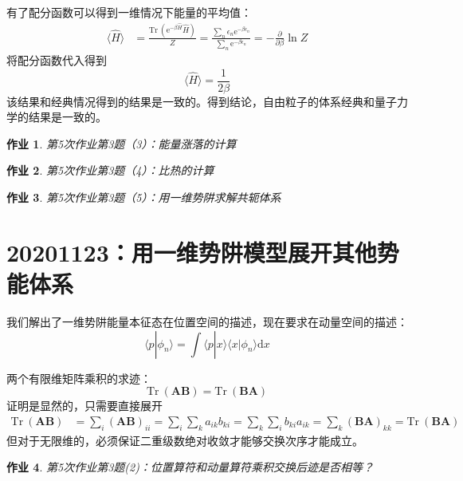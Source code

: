 \documentclass[12pt]{article}
\newtheorem{asg}{作业}
\begin{document}
    有了配分函数可以得到一维情况下能量的平均值：
    \begin{equation}\begin{aligned}
        \langle \hat{H} \rangle &= \frac {\mathrm{Tr} \ (\mathrm{e}^{-\beta \hat{H}} \hat{H})}Z
        = \frac {\sum_n \epsilon_n \mathrm{e}^{-\beta \epsilon_n}}{\sum_n \mathrm{e}^{-\beta \epsilon_n}}
        = -\frac {\partial}{\partial \beta} \ln{Z}
    \end{aligned}\end{equation}
    将配分函数代入得到
    \[ \langle \hat{H} \rangle = \frac 1{2\beta} \]
    该结果和经典情况得到的结果是一致的。得到结论，自由粒子的体系经典和量子力学的结果是一致的。
    \begin{asg}
        第5次作业第3题（3）：能量涨落的计算
    \end{asg}
    \begin{asg}
        第5次作业第3题（4）：比热的计算
    \end{asg}
    \begin{asg}
        第5次作业第3题（5）：用一维势阱求解共轭体系
    \end{asg}

\section{20201123：用一维势阱模型展开其他势能体系}

    我们解出了一维势阱能量本征态在位置空间的描述，现在要求在动量空间的描述：
    \[ \langle p|\phi_n \rangle = \int \langle p|x \rangle \langle x |\phi_n \rangle \mathrm{d}x \]

    两个有限维矩阵乘积的求迹：
    \begin{equation}
        \mathrm{Tr} \ (\bm{AB}) = \mathrm{Tr} \ (\bm{BA})
    \end{equation}
    证明是显然的，只需要直接展开
    \begin{equation}\begin{aligned}
        \mathrm{Tr} \ (\bm{AB}) &= \sum_i (\bm{AB})_{ii}
        = \sum_i \sum_k a_{ik}b_{ki}
        = \sum_k \sum_i b_{ki}a_{ik}
        = \sum_k \bm{(BA)}_{kk}
        = \mathrm{Tr} \ (\bm{BA})
    \end{aligned}\end{equation}
    但对于无限维的，必须保证二重级数绝对收敛才能够交换次序才能成立。
    \begin{asg}
        第5次作业第3题(2)：位置算符和动量算符乘积交换后迹是否相等？
    \end{asg}
\end{document}

